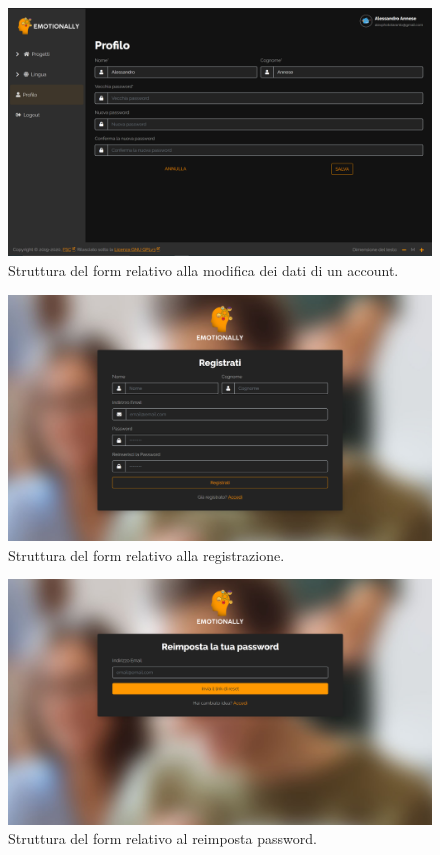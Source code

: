\begin{figure}[H]
	\centering
	\caption{Struttura del form relativo alla modifica dei dati di un account.}
	\label{fig:struttura-form:modifica-dati-account}
	\includegraphics[width=\textwidth]{images/struttura-form/form-modifica-account}
\end{figure}

\begin{figure}[H]
	\centering
	\caption{Struttura del form relativo alla registrazione.}
	\label{fig:struttura-form:registrazione}
	\includegraphics[width=\textwidth]{images/struttura-form/form-registrazione}
\end{figure}

\begin{figure}[H]
	\centering
	\caption{Struttura del form relativo al reimposta password.}
	\label{fig:struttura-form:reimposta-password}
	\includegraphics[width=\textwidth]{images/struttura-form/form-reimposta-password}
\end{figure}


